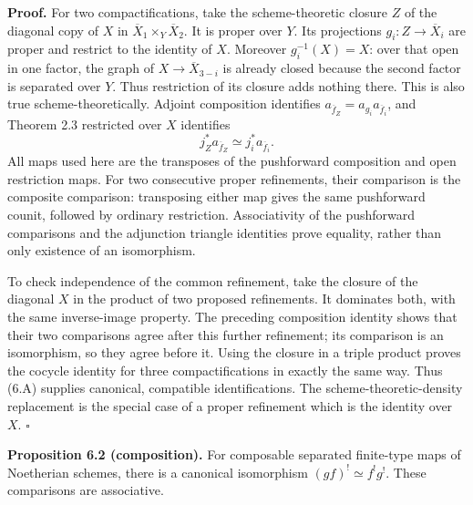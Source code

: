 \documentclass[11pt]{article}
\begin{document}
\textbf{Proof.} For two compactifications, take the scheme-theoretic
closure \(Z\) of the diagonal copy of \(X\) in
\(\overline X_1\times_Y\overline X_2\). It is proper over \(Y\). Its
projections \(g_i:Z\to\overline X_i\) are proper and restrict to the
identity of \(X\). Moreover \(g_i^{-1}(X)=X\): over that open in one
factor, the graph of \(X\to\overline X_{3-i}\) is already closed because
the second factor is separated over \(Y\). Thus restriction of its
closure adds nothing there. This is also true scheme-theoretically.
Adjoint composition identifies
\(a_{\overline f_Z}=a_{g_i}a_{\overline f_i}\), and Theorem 2.3
restricted over \(X\) identifies \[
j_Z^*a_{\overline f_Z}
\simeq j_i^*a_{\overline f_i}.
\tag{6.A}
\] All maps used here are the transposes of the pushforward composition
and open restriction maps. For two consecutive proper refinements, their
comparison is the composite comparison: transposing either map gives the
same pushforward counit, followed by ordinary restriction. Associativity
of the pushforward comparisons and the adjunction triangle identities
prove equality, rather than only existence of an isomorphism.

To check independence of the common refinement, take the closure of the
diagonal \(X\) in the product of two proposed refinements. It dominates
both, with the same inverse-image property. The preceding composition
identity shows that their two comparisons agree after this further
refinement; its comparison is an isomorphism, so they agree before it.
Using the closure in a triple product proves the cocycle identity for
three compactifications in exactly the same way. Thus (6.A) supplies
canonical, compatible identifications. The scheme-theoretic-density
replacement is the special case of a proper refinement which is the
identity over \(X\). \(\square\)

\textbf{Proposition 6.2 (composition).} For composable separated
finite-type maps of Noetherian schemes, there is a canonical isomorphism
\((gf)^!\simeq f^!g^!\). These comparisons are associative.
\end{document}
